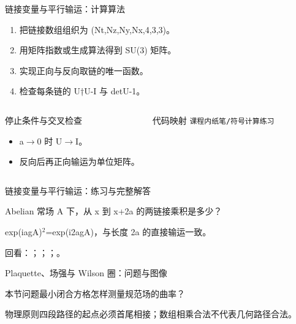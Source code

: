 \begin{frame}[t]{链接变量与平行输运：计算算法}
\footnotesize
{}\begin{enumerate}
\item 把链接数组组织为 (Nt,Nz,Ny,Nx,4,3,3)。
\item 用矩阵指数或生成算法得到 SU(3) 矩阵。
\item 实现正向与反向取链的唯一函数。
\item 检查每条链的 U†U-I 与 detU-1。
\end{enumerate}\begin{columns}[T,onlytextwidth]
\begin{block}{停止条件与交叉检查}\scriptsize\begin{itemize}
\item[\CheckMark] a\ensuremath{\rightarrow}0 时 U\ensuremath{\rightarrow}I。
\item[\CheckMark] 反向后再正向输运为单位矩阵。
\end{itemize}\end{block}
\begin{block}{代码映射}
\scriptsize \texttt{课程内纸笔/\allowbreak{}符号计算练习}
\end{block}\end{columns}\end{frame}

\begin{frame}[t]{链接变量与平行输运：练习与完整解答}
\footnotesize
\begin{block}{}Abelian 常场 A 下，从 x 到 x+2a 的两链接乘积是多少？\end{block}
\begin{exampleblock}{}exp(iagA)\ensuremath{^{2}}=exp(i2agA)，与长度 2a 的直接输运一致。\end{exampleblock}
\vfill
\scriptsize 回看：；；；。
\end{frame}

\begin{frame}[t]{Plaquette、场强与 Wilson 圈：问题与图像}
\footnotesize
\begin{block}{本节问题}最小闭合方格怎样测量规范场的曲率？\end{block}
\begin{block}{物理原则}\quad 四段路径的起点必须首尾相接；数组相乘合法不代表几何路径合法。\end{block}
\end{frame}

